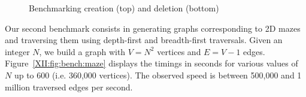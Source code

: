 \begin{figure}
  \caption{Benchmarking creation (top) and deletion (bottom)}
  \label{XII:fig:bench:build}
\end{figure}

Our second benchmark consists in generating graphs corresponding to 2D
mazes and traversing them using depth-first and breadth-first
traversals. Given an integer $N$, we build a graph with $V=N^2$
vertices and $E=V-1$ edges.  Figure~\ref{XII:fig:bench:maze} displays
the timings in seconds for various values of $N$ up to 600 (i.e.
360,000 vertices). The observed speed is between 500,000 and 1 million
traversed edges per second.

% 

